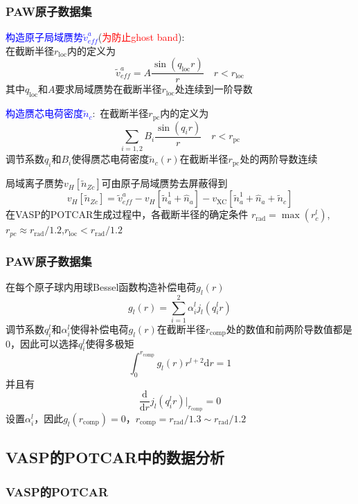 \frame
{
	\frametitle{\textrm{PAW}原子数据集}
	\textcolor{blue}{构造原子局域赝势$\tilde v_{e\!f\!f}^a$}(\textcolor{red}{为防止\textrm{ghost band}}):\\在截断半径$r_{\mathrm{loc}}$内的定义为
	$$\tilde v_{e\!f\!f}^a=A\dfrac{\sin(q_{\mathrm{loc}}r)}r\quad r<r_{\mathrm{loc}}$$
	其中$q_{\mathrm{loc}}$和$A$要求局域赝势在截断半径$r_{\mathrm{loc}}$处连续到一阶导数

	\textcolor{blue}{构造赝芯电荷密度$\tilde n_c$}:~在截断半径$r_{\mathrm{pc}}$内的定义为
	$$\sum_{i=1,2}B_i\dfrac{\sin(q_ir)}r\quad r<r_{\mathrm{pc}}$$
	调节系数$q_i$和$B_i$使得赝芯电荷密度$\tilde n_c(r)$在截断半径$r_{\mathrm{pc}}$处的两阶导数连续

	局域离子赝势$v_H[\tilde n_{Zc}]$可由原子局域赝势去屏蔽得到
	$$v_H[\tilde n_{Zc}]=\tilde v_{e\!f\!f}^a-v_H[\tilde n_a^1+\hat n_a]-v_{\mathrm{XC}}[\tilde n_a^1+\hat n_a+\tilde n_c]$$
	在\textrm{VASP}的\textrm{POTCAR}生成过程中，各截断半径的确定条件
	$r_{\mathrm{rad}}=\max({r_c^l})$,$r_{pc}\approx r_{\mathrm{rad}}/1.2$,$r_{\mathrm{loc}}<r_{\mathrm{rad}}/1.2$
}

\frame
{
	\frametitle{\textrm{PAW}原子数据集}
	在每个原子球内用球\textrm{Bessel}函数构造补偿电荷$g_l(r)$
	$$g_l(r)=\sum_{i=1}^2\alpha_i^lj_l(q_i^lr)$$
	调节系数$q_i^l$和$\alpha_i^l$使得补偿电荷$g_l(r)$在截断半径$r_{\mathrm{comp}}$处的数值和前两阶导数值都是0，因此可以选择$q_i^l$使得多极矩
	$$\int_0^{r_{\mathrm{comp}}}g_l(r)r^{l+2}\mathrm{d}r=1$$
	并且有
	$$\dfrac{\mathrm{d}}{\mathrm{d}r}j_l(q_i^lr)\bigg|_{r_{\mathrm{comp}}}=0$$
	设置$\alpha_i^l$，因此$g_l(r_{\mathrm{comp}})=0$，$r_{\mathrm{comp}}=r_{\mathrm{rad}}/1.3\sim r_{\mathrm{rad}}/1.2$
}

\subsection{\rm{VASP}的\rm{POTCAR}中的数据分析}
\frame
{
	\frametitle{\rm{VASP}的\rm{POTCAR}}
\centering
\vspace{-0.15in}
\fontsize{4.8pt}{4.2pt}\selectfont{
}
}

